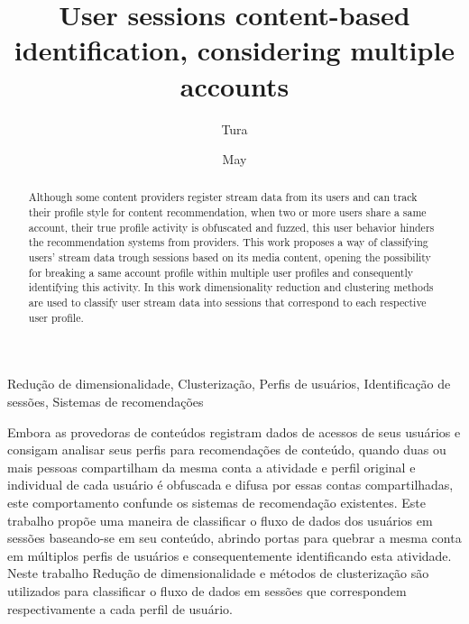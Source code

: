 \documentclass[ecp,tc,english]{iiufrgs}
\title{User sessions content-based identification, considering multiple accounts}
\author{Tura}{Matheus Toazza}
\date{May}{2021}
\begin{document}
\maketitle




\begin{abstract}
  Although some content providers register stream data from its users and can track their profile style for content recommendation, when two or more users share a same account, their true profile activity is obfuscated and fuzzed, this user behavior hinders the recommendation systems from providers. This work proposes a way of classifying users' stream data trough sessions based on its media content, opening the possibility for breaking a same account profile within multiple user profiles and consequently identifying this activity. In this work dimensionality reduction and clustering methods are used to classify user stream data into sessions that correspond to each respective user profile.
\end{abstract}

\begin{englishabstract}{}{Redução de dimensionalidade, Clusterização, Perfis de usuários, Identificação de sessões, Sistemas de recomendações}

  Embora as provedoras de conteúdos registram dados de acessos de seus usuários e consigam analisar seus perfis para recomendações de conteúdo, quando duas ou mais pessoas compartilham da mesma conta a atividade e perfil original e individual de cada usuário é obfuscada e difusa por essas contas compartilhadas, este comportamento confunde os sistemas de recomendação existentes. 
  Este trabalho propõe uma maneira de classificar o fluxo de dados dos usuários em sessões baseando-se em seu conteúdo, abrindo portas para quebrar a mesma conta em múltiplos perfis de usuários e consequentemente identificando esta atividade. Neste trabalho Redução de dimensionalidade e métodos de clusterização são utilizados para classificar o fluxo de dados em sessões que correspondem respectivamente a cada perfil de usuário.
\end{englishabstract}
\end{document}
